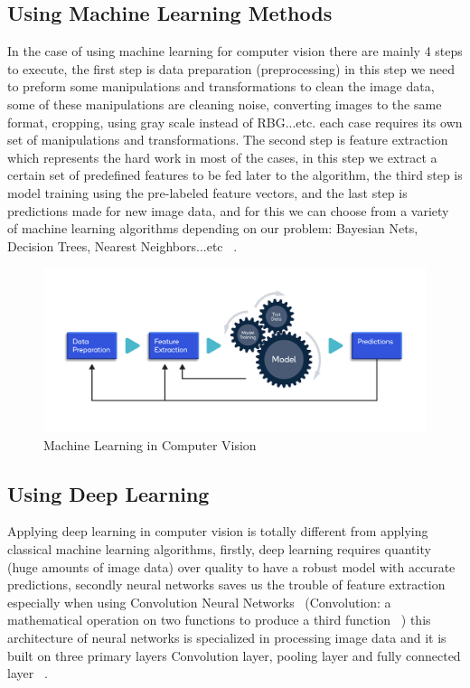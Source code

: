     \subsection{Using Machine Learning Methods}
        In the case of using machine learning for computer vision there are mainly 4 steps to execute, the first step is data preparation (preprocessing) in this step we need to preform some manipulations and transformations to clean the image data, some of these manipulations are cleaning noise, converting images to the same format, cropping, using gray scale instead of RBG...etc. each case requires its own set of manipulations and transformations. The second step is feature extraction which represents the hard work in most of the cases, in this step we extract a certain set of predefined features to be fed later to the algorithm, the third step is model training using the pre-labeled feature vectors, and the last step is predictions made for new image data, and for this we can choose from a variety of machine learning algorithms depending on our problem: Bayesian Nets, Decision Trees, Nearest Neighbors...etc ~\cite{mldlcv}.
        \begin{figure}[htbp]
        \begin{center}
        \includegraphics[width=12cm]{./chapter-02-general-ai-information/machine-learning-cv.png}
        \end{center}
        \caption{Machine Learning in Computer Vision ~\cite{mldlcv}}
        \label{fig:mldlcv}
        \end{figure}
    \subsection{Using Deep Learning} 
        Applying deep learning in computer vision is totally different from applying classical machine learning algorithms, firstly,  deep learning requires quantity (huge amounts of image data) over quality to have a robust model with accurate predictions, secondly neural networks saves us the trouble of feature extraction especially when using Convolution Neural Networks ~\cite{machine-learning-full-scale}(Convolution: a mathematical operation on two functions to produce a third function ~\cite{machine-learning-ibm}) this architecture of neural networks is specialized in processing image data and it is built on three primary layers Convolution layer, pooling layer and fully connected layer  ~\cite{mldlcv}.


